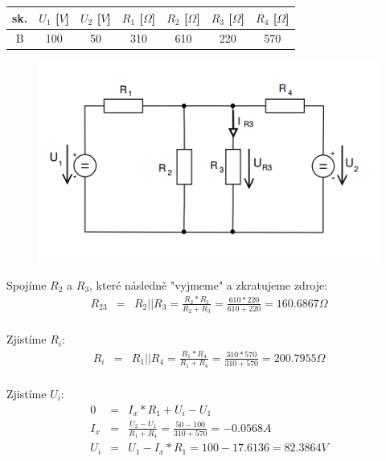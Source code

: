 \documentclass[a4paper,oneside,13pt]{article}
\begin{document}
	\begin{table}[h]
		\begin{center}
			\begin{tabular}{|c|c|c|c|c|c|c|}
				\hline
				sk. & $U_1$ [$V$] & $U_2$ [$V$] & $R_{1}$ [$\Omega$] & $R_{2}$ [$\Omega$] & $R_{3}$ [$\Omega$] & $R_{4}$ [$\Omega$]  \\
				\hline
				B & 100 & 50 & 310 & 610 & 220 & 570 \\
				\hline
			\end{tabular}
		\end{center}
	\end{table}
	
	\begin{figure}[h]
		\begin{center}
			\includegraphics[width=12cm,keepaspectratio]{Thevenin_2.PNG}
		\end{center}
	\end{figure}
	
	Spojíme $R_{2}$ a $R_{3}$, které následně "vyjmeme" a zkratujeme zdroje:
	\begin{eqnarray*}
		R_{23} & = & R_{2} || R_{3} = \frac{R_{2} * R_{3}}{R_{2} + R_{3}} = \frac{610 * 220}{610 + 220} = 160.6867 \Omega \\
	\end{eqnarray*}

	Zjistíme $R_{i}$:
	\begin{eqnarray*}
		R_{i} & = & R_{1} || R_{4} = \frac{R_{1} * R_{4}}{R_{1} + R_{4}} = \frac{310 * 570}{310 + 570} = 200.7955 \Omega \\
	\end{eqnarray*}

	Zjistíme $U_{i}$:
	\begin{eqnarray*}
		0 & = & I_{x} * R_{1} + U_{i} - U_{1} \\
		I_{x} & = & \frac{U_{2} - U_{1}}{R_{1} + R_{4}} = \frac{50 - 100}{310 + 570} = -0.0568A \\
		U_{i} & = & U_{1} - I_{x} * R_{1} = 100 -17.6136 = 82.3864V \\ 
	\end{eqnarray*}
\end{document}
